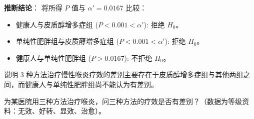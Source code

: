 \documentclass[lang=cn,10pt]{elegantbook}
\begin{document}
\textbf{推断结论}：
将所得 $P$ 值与 $\alpha' = 0.0167$ 比较：
\begin{itemize}
    \item 健康人与皮质醇增多症组 ($P < 0.001 < \alpha'$): 拒绝 $H_0$。
    \item 单纯性肥胖组与皮质醇增多症组 ($P < 0.001 < \alpha'$): 拒绝 $H_0$。
    \item 健康人与单纯性肥胖组 ($P > 0.0167$): 不拒绝 $H_0$。
\end{itemize}

说明 3 种方法治疗慢性喉炎疗效的差别主要存在于皮质醇增多症组与其他两组之间，而健康人与单纯性肥胖组尚不能认为有差别。

\vspace{0.2cm}
\begin{exercise}[多组等级数据的比较]
为某医院用三种方法治疗喉炎，问三种方法的疗效是否有差别？（数据为等级资料：无效、好转、显效、治愈）。
\end{exercise}
\end{document}
